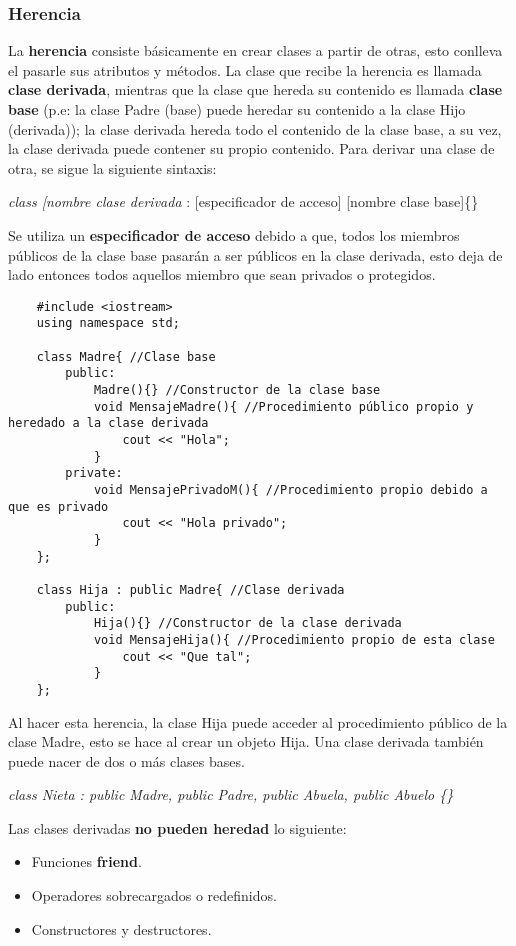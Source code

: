 \subsubsection{Herencia}
La \textbf{herencia} consiste básicamente en crear clases a partir de otras, esto conlleva el pasarle sus atributos y métodos. La clase que recibe la herencia es llamada \textbf{clase derivada}, mientras que la clase que hereda su contenido es llamada \textbf{clase base} (p.e: la clase Padre (base) puede heredar su contenido a la clase Hijo (derivada)); la clase derivada hereda todo el contenido de la clase base, a su vez, la clase derivada puede contener su propio contenido. Para derivar una clase de otra, se sigue la siguiente sintaxis:\begin{center}\textit{class [nombre clase derivada} : [especificador de acceso] [nombre clase base]\{\}\end{center}
Se utiliza un \textbf{especificador de acceso} debido a que, todos los miembros públicos de la clase base pasarán a ser públicos en la clase derivada, esto deja de lado entonces todos aquellos miembro que sean privados o protegidos.
\begin{lstlisting}
    #include <iostream>
    using namespace std;
    
    class Madre{ //Clase base
        public:
            Madre(){} //Constructor de la clase base
            void MensajeMadre(){ //Procedimiento público propio y heredado a la clase derivada
                cout << "Hola";
            }
        private:
            void MensajePrivadoM(){ //Procedimiento propio debido a que es privado
                cout << "Hola privado";
            }
    };
    
    class Hija : public Madre{ //Clase derivada
        public:
            Hija(){} //Constructor de la clase derivada
            void MensajeHija(){ //Procedimiento propio de esta clase
                cout << "Que tal";
            }
    };
\end{lstlisting}
Al hacer esta herencia, la clase Hija puede acceder al procedimiento público de la clase Madre, esto se hace al crear un objeto Hija. Una clase derivada también puede nacer de dos o más clases bases.\begin{center}\textit{class Nieta : public Madre, public Padre, public Abuela, public Abuelo \{\}}\end{center}
Las clases derivadas \textbf{no pueden heredad} lo siguiente:
\begin{itemize}
    \item Funciones \textbf{friend}.
    \item Operadores sobrecargados o redefinidos.
    \item Constructores y destructores.
\end{itemize}

